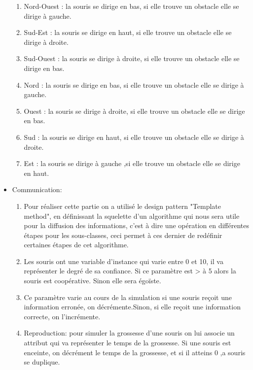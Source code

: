 \begin{itemize}
\begin{enumerate}
\item Nord-Ouest : la souris se dirige en bas, si elle trouve un obstacle elle se dirige à gauche.
\item Sud-Est : la souris se dirige en haut, si elle trouve un obstacle elle se dirige à droite.
\item Sud-Ouest : la souris se dirige à droite, si elle trouve un obstacle elle se dirige en bas.
\item Nord : la souris se dirige en bas, si elle trouve un obstacle elle se dirige à gauche.
\item Ouest : la souris se dirige à droite, si elle trouve un obstacle elle se dirige en bas.
\item Sud : la souris se dirige en haut, si elle trouve un obstacle elle se dirige à droite.
\item Est : la souris se dirige à gauche ,si elle trouve un obstacle elle se dirige en haut.
\end{enumerate}
\item Communication:
\begin{enumerate}
\item Pour réaliser cette partie on a utilisé le design pattern "Template method", en définissant la squelette d'un algorithme qui nous sera utile pour la diffusion des informations, c'est à dire une opération en différentes étapes pour les sous-classes, ceci permet à ces dernier de redéfinir certaines étapes de cet algorithme.
\item Les souris ont une variable d'instance qui varie entre 0 et 10, il va représenter le degré de sa confiance. Si ce paramètre est > à 5 alors la souris est coopérative. Sinon elle sera égoïste.
\item Ce paramètre varie au cours de la simulation si une souris reçoit une information erronée, on décrémente.Sinon, si elle reçoit une information correcte, on l'incrémente.

\item Reproduction: pour simuler la grossesse d'une souris on lui associe un attribut qui va représenter le temps de la grossesse. Si une souris est enceinte, on décrément le temps de la grossesse, et si il atteins 0 ,a souris se duplique.
\end{enumerate}
\end{itemize}

